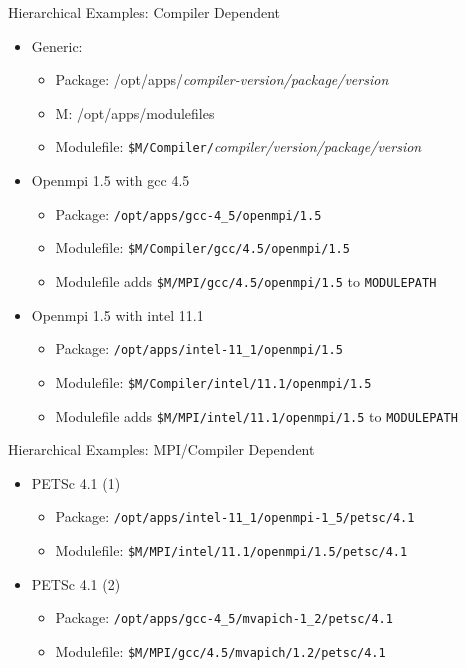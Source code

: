 \documentclass{beamer}
\begin{document}
\begin{frame}{Hierarchical Examples: Compiler Dependent}
  \begin{itemize}
    \item Generic:
      \begin{itemize}
        \item Package: /opt/apps/\emph{compiler-version/package/version}
        \item M: {\color{blue}/opt/apps/modulefiles}
        \item Modulefile: \texttt{{\color{blue}\$M}/Compiler/}\emph{compiler/version/package/version}
      \end{itemize}
    \item Openmpi 1.5 with gcc 4.5
      \begin{itemize}
        \item Package: \texttt{/opt/apps/gcc-4\_5/openmpi/1.5}
        \item Modulefile: \texttt{{\color{blue}\$M}/Compiler/gcc/4.5/openmpi/1.5}
        \item Modulefile adds \texttt{{\color{blue}\$M}/MPI/gcc/4.5/openmpi/1.5}
          to \texttt{MODULEPATH} \\
      \end{itemize}
    \item Openmpi 1.5 with intel 11.1
      \begin{itemize}
        \item Package: \texttt{/opt/apps/intel-11\_1/openmpi/1.5}
        \item Modulefile: \texttt{{\color{blue}\$M}/Compiler/intel/11.1/openmpi/1.5}
        \item Modulefile adds \texttt{\$M/MPI/intel/11.1/openmpi/1.5}
          to \texttt{MODULEPATH}

      \end{itemize}
  \end{itemize}
\end{frame}

\begin{frame}{Hierarchical Examples: MPI/Compiler Dependent}
  \begin{itemize}
    \item PETSc 4.1 (1)
      \begin{itemize}
        \item Package: \texttt{/opt/apps/intel-11\_1/openmpi-1\_5/petsc/4.1}
        \item Modulefile: \texttt{{\color{blue}\$M}/MPI/intel/11.1/openmpi/1.5/petsc/4.1}
      \end{itemize}
    \item PETSc 4.1 (2)
      \begin{itemize}
        \item Package: \texttt{/opt/apps/gcc-4\_5/mvapich-1\_2/petsc/4.1}
        \item Modulefile: \texttt{{\color{blue}\$M}/MPI/gcc/4.5/mvapich/1.2/petsc/4.1}
      \end{itemize}
  \end{itemize}
\end{frame}
\end{document}
